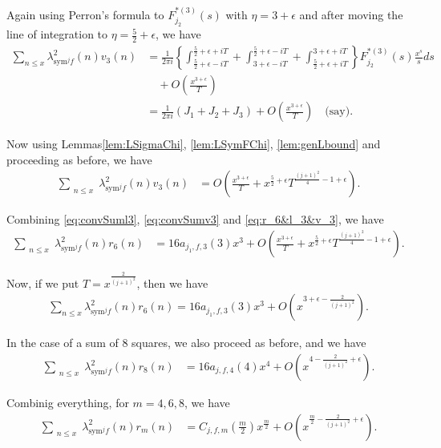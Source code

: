 \documentclass[10pt]{amsart}
\begin{document}
Again using Perron's formula to $F_{j_2}^{*(3)}(s)$ with $\eta = 3+\epsilon$ and after moving the line of integration to $\eta = \frac{5}{2}+\epsilon$, we have  
\begin{align}
    \sum_{n\leq x}\lambda_{\mathrm{sym}^{j}f}^2(n)v_3(n) & = \frac{1}{2\pi i}\left\{\int_{\frac{5}{2}+\epsilon-iT}^{\frac{5}{2}+\epsilon+iT}+\int_{3+\epsilon-iT}^{\frac{5}{2}+\epsilon-iT}+\int_{\frac{5}{2}+\epsilon+iT}^{3+\epsilon+iT}\right\}F_{j_2}^{*(3)}(s)\frac{x^{s}}{s}ds \\
    &\quad + O\left(\frac{x^{3+\epsilon}}{T}\right) \\
    &= \frac{1}{2\pi i}(J_{1}+J_{2}+J_{3})+O\left(\frac{x^{3+\epsilon}}{T}\right) \quad \text{(say)}.
\end{align}

Now using Lemmas\ref{lem:LSigmaChi}, \ref{lem:LSymFChi}, \ref{lem:genLbound} and proceeding as before, we have 
\begin{align} \label{eq:convSumv3}
    \sum_{\substack{n\leq x}}\lambda_{\mathrm{sym}^jf}^2(n)v_3(n) &= O \left( \frac{x^{3+\epsilon}}{T}+ {x^{\frac{5}{2}+\epsilon}T^{\frac{(j+1)^2}{4}-1+\epsilon}} \right).
\end{align}

Combining \eqref{eq:convSuml3}, \eqref{eq:convSumv3} and \eqref{eq:r_6&l_3&v_3}, we have \begin{align} 
    \sum_{\substack{n\leq x}}\lambda_{\mathrm{sym}^jf}^2(n)r_6(n) &= 16a_{j_1,f,3}(3)x^3 + O \left( \frac{x^{3+\epsilon}}{T}+ {x^{\frac{5}{2}+\epsilon}T^{\frac{(j+1)^2}{4}-1+\epsilon}} \right).
\end{align}

Now,  if we put $T = x^{\frac{2}{(j+1)^2}}$, then we have \begin{align}
    \sum_{n\leq x}\lambda_{\mathrm{sym}^{j}f}^2(n)r_{6}(n) = 16a_{j_1,f,3}(3)x^3 + O\left( x^{3+\epsilon-\frac{2}{(j+1)^2}} \right).
\end{align}

In the case of a sum of $8$ squares, we also proceed as before, and we have 
\begin{align}
    \sum_{\substack{n\leq x }}\lambda_{\mathrm{sym}^jf}^2(n)r_8(n) &= 16a_{j,f,4}(4)x^{4} + O \left( x^{4-\frac{2}{(j+1)^2}+\epsilon}\right).
\end{align}

Combinig everything, for $m=4,6,8$, we have 
\begin{align}
    \sum_{\substack{n\leq x }}\lambda_{\mathrm{sym}^jf}^2(n)r_m(n) &= C_{j,f,m}\left(\frac{m}{2}\right)x^{\frac{m}{2}} + O \left( x^{\frac{m}{2}-\frac{2}{(j+1)^2}+\epsilon} \right).
\end{align}
\end{document}
